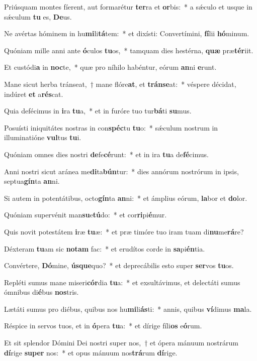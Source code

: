 \item Priúsquam montes fíerent, aut formarétur \textbf{ter}ra et \textbf{or}bis:~* a sǽculo et usque in sǽculum \textbf{tu} es, \textbf{De}us.
\item Ne avértas hóminem in hu\textbf{mi}li\textbf{tá}tem:~* et dixísti: Convertímini, \textbf{fí}lii \textbf{hó}minum.
\item Quóniam mille anni ante \textbf{ó}culos \textbf{tu}os,~* tamquam dies hestérna, \textbf{quæ} præ\textbf{tér}iit.
\item Et custódi\textbf{a} in \textbf{noc}te,~* quæ pro níhilo habéntur, eórum \textbf{an}ni \textbf{e}runt.
\item Mane sicut herba tránseat,~† mane flóre\textbf{at}, et \textbf{tráns}\textbf{e}at:~* véspere décidat, indúret \textbf{et} a\textbf{rés}cat.
\item Quia defécimus in \textbf{i}ra \textbf{tu}a,~* et in furóre tuo tur\textbf{bá}ti \textbf{su}mus.
\item Posuísti iniquitátes nostras in con\textbf{spéc}tu \textbf{tu}o:~* sǽculum nostrum in illuminatióne \textbf{vul}tus \textbf{tu}i.
\item Quóniam omnes dies nostri \textbf{de}fe\textbf{cé}runt:~* et in ira \textbf{tu}a de\textbf{fé}cimus.
\item Anni nostri sicut aránea me\textbf{di}ta\textbf{bún}tur:~* dies annórum nostrórum in ipsis, septua\textbf{gín}ta \textbf{an}ni.
\item Si autem in potentátibus, octo\textbf{gín}ta \textbf{an}ni:~* et ámplius eórum, \textbf{la}bor et \textbf{do}lor.
\item Quóniam supervénit man\textbf{su}e\textbf{tú}do:~* et cor\textbf{ri}pi\textbf{é}mur.
\item Quis novit potestátem \textbf{i}ræ \textbf{tu}æ:~* et præ timóre tuo iram tuam di\textbf{nu}me\textbf{rá}re?
\item Déxteram \textbf{tu}am sic \textbf{no}\textbf{tam} fac:~* et erudítos corde in \textbf{sa}pi\textbf{én}tia.
\item Convértere, \textbf{Dó}mine, \textbf{ús}\textbf{que}quo?~* et deprecábilis esto super \textbf{ser}vos \textbf{tu}os.
\item Repléti sumus mane miseri\textbf{cór}dia \textbf{tu}a:~* et exsultávimus, et delectáti sumus ómnibus di\textbf{é}bus \textbf{nos}tris.
\item Lætáti sumus pro diébus, quibus nos hu\textbf{mi}li\textbf{ás}ti:~* annis, quibus \textbf{ví}dimus \textbf{ma}la.
\item Réspice in servos tuos, et in \textbf{ó}pera \textbf{tu}a:~* et dírige fíli\textbf{os} e\textbf{ó}rum.
\item Et sit splendor Dómini Dei nostri super nos,~† et ópera mánuum nostrárum \textbf{dí}rige \textbf{su}\textbf{per} nos:~* et opus mánuum nos\textbf{trá}rum \textbf{dí}rige.
